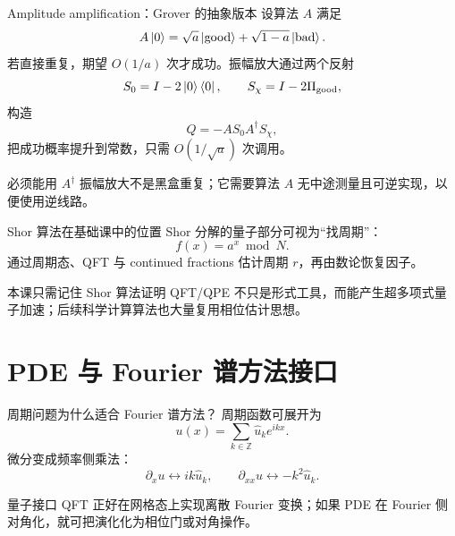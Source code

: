 \documentclass[aspectratio=169,10pt]{ctexbeamer}
\begin{document}
\begin{frame}{Amplitude amplification：Grover 的抽象版本}
设算法 $A$ 满足
\[
A\ket0=\sqrt a\ket{\mathrm{good}}+\sqrt{1-a}\ket{\mathrm{bad}}.
\]
若直接重复，期望 $O(1/a)$ 次才成功。振幅放大通过两个反射
\[
S_0=I-2\ket0\bra0,
\qquad S_{\chi}=I-2\Pi_{\mathrm{good}},
\]
构造
\[
Q=-A S_0 A^{\dagger}S_{\chi},
\]
把成功概率提升到常数，只需 $O(1/\sqrt a)$ 次调用。
\begin{warnbox}{必须能用 $A^{\dagger}$}
振幅放大不是黑盒重复；它需要算法 $A$ 无中途测量且可逆实现，以便使用逆线路。
\end{warnbox}
\end{frame}

\begin{frame}{Shor 算法在基础课中的位置}
Shor 分解的量子部分可视为“找周期”：
\[
f(x)=a^x\bmod N.
\]
通过周期态、QFT 与 continued fractions 估计周期 $r$，再由数论恢复因子。
\begin{center}
\end{center}
\begin{keybox}{本课只需记住}
Shor 算法证明 QFT/QPE 不只是形式工具，而能产生超多项式量子加速；后续科学计算算法也大量复用相位估计思想。
\end{keybox}
\end{frame}

\section{PDE 与 Fourier 谱方法接口}

\begin{frame}{周期问题为什么适合 Fourier 谱方法？}
周期函数可展开为
\[
u(x)=\sum_{k\in\mathbb Z}\hat u_k e^{ikx}.
\]
微分变成频率侧乘法：
\[
\partial_x u \longleftrightarrow ik\hat u_k,
\qquad
\partial_{xx}u \longleftrightarrow -k^2\hat u_k.
\]
\begin{keybox}{量子接口}
QFT 正好在网格态上实现离散 Fourier 变换；如果 PDE 在 Fourier 侧对角化，就可把演化化为相位门或对角操作。
\end{keybox}
\end{frame}
\end{document}
